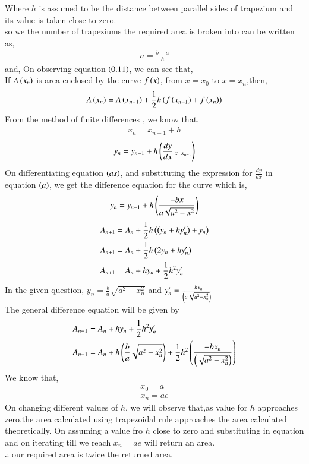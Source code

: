 \documentclass[journal]{IEEEtran}
\begin{document}
Where $h$ is assumed to be the distance between parallel sides of trapezium and its value is taken close to zero.\\
so we the number of trapeziums the required area is broken into can be written as,
\begin{align}
    n = \frac{b - a}{h}
\end{align}
and,
On observing equation $\left(0.11\right)$, we can see that,\\
If $A\left(x_n\right)$ is area enclosed by the curve $f\left(x\right)$, from $x=x_0$ to $x=x_n$,then,
\begin{align}
    A\left(x_n\right) = A\left(x_{n-1}\right) + \frac{1}{2}h\left(f\left(x_{n-1}\right) + f\left(x_n\right)\right)
\end{align}
From the method of finite differences , we know that,
\begin{align}
    x_n = x_{n-1} + h
\end{align}
\begin{align}
    y_{n} = y_{n-1} + h\left(\frac{dy}{dx}|_{x=x_{n-1}}\right)
\end{align}
On differentiating equation $\left(as\right)$, and substituting the expression for $\frac{dy}{dx}$ in equation $\left(a\right)$, we get the difference equation for the curve which is,
\begin{align}
     y_{n} = y_{n-1} + h\left(\frac{-bx}{a\sqrt{a^2 - x^2}}\right)
\end{align}
\begin{align}
  A_{n+1}&=A_n+\frac{1}{2}h\left(\left(y_{n}+hy^{\prime}_n\right)+y_n\right)\\
  A_{n+1}&=A_n+\frac{1}{2}h\left(2y_n+hy^{\prime}_n\right)\\
  A_{n+1}&=A_n+hy_n+\frac{1}{2}h^2y^{\prime}_n\\
\end{align}
In the given question, $y_n=\frac{b}{a}\sqrt{a^2-x_n^2}$ and $y^{\prime}_n= \frac{-bx_n}{\left(a\sqrt{a^2-x_n^2}\right)}$\\
The general difference equation will be given by
\begin{align}
  A_{n+1}&=A_n+hy_n+\frac{1}{2}h^2y^{\prime}_n\\
  A_{n+1}&=A_n+h\left(\frac{b}{a}\sqrt{a^2-x_n^2}\right)+\frac{1}{2}h^2\left(\frac{-bx_n}{\left(\sqrt{a^2-x_n^2}\right)}\right)\\
\end{align}
We know that,
\begin{align}
    x_0 = a\\
    x_n = ae
\end{align}
On changing different values of $h$, we will observe that,as value for $h$ approaches zero,the area calculated using trapezoidal rule approaches the area calculated theoretically.
On assuming a value fro $h$ close to zero and substituting in equation and on iterating till we reach $x_n=ae$ will return an area.\\
$\therefore$ our required area is twice the returned area.\\
\end{document}
